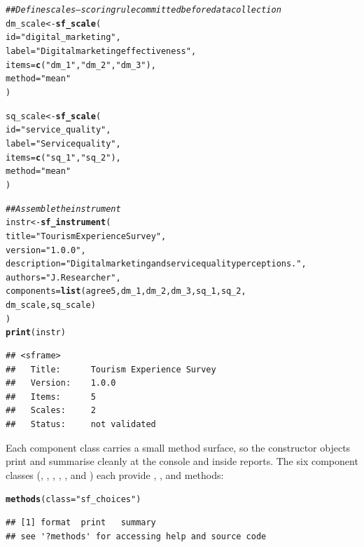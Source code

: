 \documentclass[article]{jss}\usepackage[]{graphicx}\usepackage[]{xcolor}
\makeatletter
\newcommand{\hlsng}[1]{\textcolor[rgb]{0.192,0.494,0.8}{#1}}%
\newcommand{\hlcom}[1]{\textcolor[rgb]{0.678,0.584,0.686}{\textit{#1}}}%
\newcommand{\hldef}[1]{\textcolor[rgb]{0.345,0.345,0.345}{#1}}%
\newcommand{\hlkwb}[1]{\textcolor[rgb]{0.69,0.353,0.396}{#1}}%
\newcommand{\hlkwc}[1]{\textcolor[rgb]{0.333,0.667,0.333}{#1}}%
\newcommand{\hlkwd}[1]{\textcolor[rgb]{0.737,0.353,0.396}{\textbf{#1}}}%
\newenvironment{kframe}{%
 \def\at@end@of@kframe{}%
 \ifinner\ifhmode%
  \def\at@end@of@kframe{\end{minipage}}%
  \begin{minipage}{\columnwidth}%
 \fi\fi%
 \def\FrameCommand##1{\hskip\@totalleftmargin \hskip-\fboxsep
 \colorbox{shadecolor}{##1}\hskip-\fboxsep
     \hskip-\linewidth \hskip-\@totalleftmargin \hskip\columnwidth}%
 \MakeFramed {\advance\hsize-\width
   \@totalleftmargin\z@ \linewidth\hsize
   \@setminipage}}%
 {\par\unskip\endMakeFramed%
 \at@end@of@kframe}
\newenvironment{knitrout}{}{} %
\makeatother
\begin{document}
\begin{knitrout}
\begin{kframe}
\begin{alltt}
\hlcom{## Define scales — scoring rule committed before data collection}
\hldef{dm_scale} \hlkwb{<-} \hlkwd{sf_scale}\hldef{(}
  \hlkwc{id}     \hldef{=} \hlsng{"digital_marketing"}\hldef{,}
  \hlkwc{label}  \hldef{=} \hlsng{"Digital marketing effectiveness"}\hldef{,}
  \hlkwc{items}  \hldef{=} \hlkwd{c}\hldef{(}\hlsng{"dm_1"}\hldef{,} \hlsng{"dm_2"}\hldef{,} \hlsng{"dm_3"}\hldef{),}
  \hlkwc{method} \hldef{=} \hlsng{"mean"}
\hldef{)}

\hldef{sq_scale} \hlkwb{<-} \hlkwd{sf_scale}\hldef{(}
  \hlkwc{id}     \hldef{=} \hlsng{"service_quality"}\hldef{,}
  \hlkwc{label}  \hldef{=} \hlsng{"Service quality"}\hldef{,}
  \hlkwc{items}  \hldef{=} \hlkwd{c}\hldef{(}\hlsng{"sq_1"}\hldef{,} \hlsng{"sq_2"}\hldef{),}
  \hlkwc{method} \hldef{=} \hlsng{"mean"}
\hldef{)}

\hlcom{## Assemble the instrument}
\hldef{instr} \hlkwb{<-} \hlkwd{sf_instrument}\hldef{(}
  \hlkwc{title}       \hldef{=} \hlsng{"Tourism Experience Survey"}\hldef{,}
  \hlkwc{version}     \hldef{=} \hlsng{"1.0.0"}\hldef{,}
  \hlkwc{description} \hldef{=} \hlsng{"Digital marketing and service quality perceptions."}\hldef{,}
  \hlkwc{authors}     \hldef{=} \hlsng{"J. Researcher"}\hldef{,}
  \hlkwc{components}  \hldef{=} \hlkwd{list}\hldef{(agree5, dm_1, dm_2, dm_3, sq_1, sq_2,}
                     \hldef{dm_scale, sq_scale)}
\hldef{)}
\hlkwd{print}\hldef{(instr)}
\end{alltt}
\begin{verbatim}
## <sframe>
##   Title:      Tourism Experience Survey
##   Version:    1.0.0
##   Items:      5
##   Scales:     2
##   Status:     not validated
\end{verbatim}
\end{kframe}
\end{knitrout}

Each component class carries a small  method surface, so the
constructor objects print and summarise cleanly at the console and inside
reports. The six component classes (, ,
, , , and )
each provide , , and  methods:

\begin{knitrout}
\color{fgcolor}\begin{kframe}
\begin{alltt}
\hlkwd{methods}\hldef{(}\hlkwc{class} \hldef{=} \hlsng{"sf_choices"}\hldef{)}
\end{alltt}
\begin{verbatim}
## [1] format  print   summary
## see '?methods' for accessing help and source code
\end{verbatim}
\end{kframe}
\end{knitrout}
\end{document}

